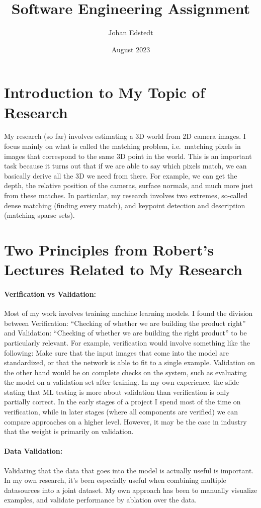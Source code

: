 \documentclass[11pt]{article}
\title{Software Engineering Assignment}
\author{Johan Edstedt}
\date{August 2023}
\begin{document}
\maketitle

\section{Introduction to My Topic of Research}
My research (so far) involves estimating a 3D world from 2D camera images. 
I focus mainly on what is called the matching problem, i.e.~matching pixels in images that correspond to the same 3D point in the world. 
This is an important task because it turns out that if we are able to say which pixels match, we can basically derive all the 3D we need from there. 
For example, we can get the depth, the relative position of the cameras, surface normals, and much more just from these matches.
In particular, my research involves two extremes, so-called dense matching (finding every match), and keypoint detection and description (matching sparse sets).

\section{Two Principles from Robert's Lectures Related to My Research}
\paragraph{Verification vs Validation:}
Most of my work involves training machine learning models. I found the division between Verification: ``Checking of whether we are building the product right'' and Validation: ``Checking of whether we are building the right product'' to be particularly relevant. For example, verification would involve something like the following: Make sure that the input images that come into the model are standardized, or that the network is able to fit to a single example. Validation on the other hand would be on complete checks on the system, such as evaluating the model on a validation set after training. In my own experience, the slide stating that ML testing is more about validation than verification is only partially correct. In the early stages of a project I spend most of the time on verification, while in later stages (where all components are verified) we can compare approaches on a higher level. However, it may be the case in industry that the weight is primarily on validation.

\paragraph{Data Validation:}
Validating that the data that goes into the model is actually useful is important. In my own research, it's been especially useful when combining multiple datasources into a joint dataset. My own approach has been to manually visualize examples, and validate performance by ablation over the data.  
\end{document}
